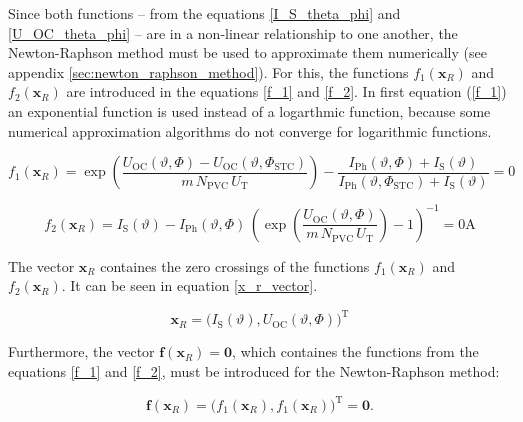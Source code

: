 Since both functions -- from the equations \ref{I_S_theta_phi} and \ref{U_OC_theta_phi} -- are in a non-linear relationship to one another, the Newton-Raphson method must be used to approximate them numerically (see appendix \ref{sec:newton_raphson_method}). For this, the functions $f_1\left( \mathrm{\mathbf{x}}_R \right)$ and $f_2\left( \mathrm{\mathbf{x}}_R \right)$ are introduced in the equations \ref{f_1} and \ref{f_2}. In first equation (\ref{f_1}) an exponential function is used instead of a logarthmic function, because some numerical approximation algorithms do not converge for logarithmic functions.
\begin{center}
	\begin{equation} \label{f_1}
		f_1 \left( \mathrm{\mathbf{x}}_R \right)  = \exp \left( \frac{U_\mathrm{OC}\left(\vartheta,\Phi\right) - U_\mathrm{OC}\left(\vartheta,\Phi_\mathrm{STC}\right)}{m \, N_\mathrm{PVC} \, U_\mathrm{T}} \right) - \frac{I_\mathrm{Ph}\left(\vartheta,\Phi\right) + I_\mathrm{S}\left(\vartheta\right)}{I_\mathrm{Ph}\left(\vartheta,\Phi_\mathrm{STC}\right) + I_\mathrm{S}\left(\vartheta\right)} = 0
	\end{equation}
\end{center}
\begin{center}
	\begin{equation} \label{f_2}
		f_2\left( \mathrm{\mathbf{x}}_R \right) = I_\mathrm{S}\left(\vartheta\right) - I_\mathrm{Ph}\left(\vartheta,\Phi\right) \, \left( \exp \left( \frac{U_\mathrm{OC}\left(\vartheta,\Phi\right)}{m \, N_\mathrm{PVC} \, U_\mathrm{T}} \right) - 1 \right)^{-1} = 0\mathrm{A}
	\end{equation}
\end{center}
The vector $\mathrm{\mathbf{x}}_R$ containes the zero crossings of the functions $f_1\left( \mathrm{\mathbf{x}}_R \right)$ and $f_2\left( \mathrm{\mathbf{x}}_R \right)$. It can be seen in equation \ref{x_r_vector}. 
\begin{center}
	\begin{equation} \label{x_r_vector}
		\mathrm{\mathbf{x}}_R = \Big( I_\mathrm{S}\left(\vartheta\right), U_\mathrm{OC}\left(\vartheta,\Phi\right) \Big)^{\mathrm T}
	\end{equation}
\end{center}
Furthermore, the vector $\mathrm{\mathbf{f}}\left(\mathrm{\mathbf{x}}_R\right) = \mathbf{0}$, which containes the functions from the equations \ref{f_1} and \ref{f_2}, must be introduced for the Newton-Raphson method:
\begin{center}
	\begin{equation} \label{f_vector}
		\mathrm{\mathbf{f}}\left(\mathrm{\mathbf{x}}_R\right) = 
  			\Big( f_{1} \left( \mathrm{\mathbf{x}}_R \right), f_{1} \left( \mathrm{\mathbf{x}}_R \right) \Big)^{\mathrm T} = \mathrm{\mathbf{0}} \text{.}
	\end{equation}
\end{center}

